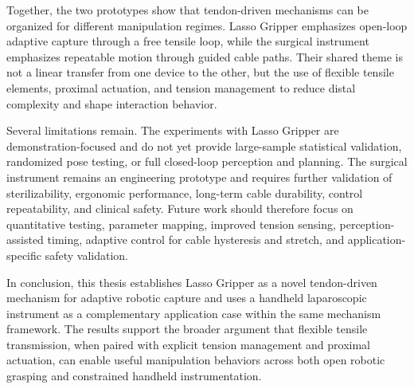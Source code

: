 Together, the two prototypes show that tendon-driven mechanisms can be organized for different manipulation regimes. Lasso Gripper emphasizes open-loop adaptive capture through a free tensile loop, while the surgical instrument emphasizes repeatable motion through guided cable paths. Their shared theme is not a linear transfer from one device to the other, but the use of flexible tensile elements, proximal actuation, and tension management to reduce distal complexity and shape interaction behavior.

Several limitations remain. The experiments with Lasso Gripper are demonstration-focused and do not yet provide large-sample statistical validation, randomized pose testing, or full closed-loop perception and planning. The surgical instrument remains an engineering prototype and requires further validation of sterilizability, ergonomic performance, long-term cable durability, control repeatability, and clinical safety. Future work should therefore focus on quantitative testing, parameter mapping, improved tension sensing, perception-assisted timing, adaptive control for cable hysteresis and stretch, and application-specific safety validation.

In conclusion, this thesis establishes Lasso Gripper as a novel tendon-driven mechanism for adaptive robotic capture and uses a handheld laparoscopic instrument as a complementary application case within the same mechanism framework. The results support the broader argument that flexible tensile transmission, when paired with explicit tension management and proximal actuation, can enable useful manipulation behaviors across both open robotic grasping and constrained handheld instrumentation.
